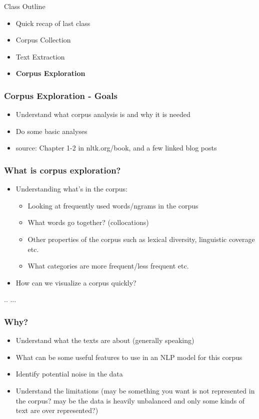 \documentclass{beamer}
\begin{document}
\begin{frame}{Class Outline}
\begin{itemize}
    \item Quick recap of last class
    \item Corpus Collection
    \item Text Extraction
    \item \textbf{Corpus Exploration}
\end{itemize}
\end{frame}

\begin{frame}
\frametitle{Corpus Exploration - Goals}
\begin{itemize}
\item Understand what corpus analysis is and why it is needed
\item Do some basic analyses
\item source: Chapter 1-2 in nltk.org/book, and a few linked blog posts
\end{itemize}
\end{frame}

\begin{frame}
\frametitle{What is corpus exploration?}
\begin{itemize}
\item Understanding what's in the corpus:
\begin{itemize}
\item Looking at frequently used words/ngrams in the corpus
\item What words go together? (collocations)
\item Other properties of the corpus such as lexical diversity, linguistic coverage etc.
\item What categories are more frequent/less frequent etc. 
\end{itemize}
\item How can we visualize a corpus quickly? 
\end{itemize}
.. ... 
\end{frame}

\begin{frame}
\frametitle{Why? }
\begin{itemize}
\item Understand what the texts are about (generally speaking)
\item What can be some useful features to use in an NLP model for this corpus
\item Identify potential noise in the data  
\item Understand the limitations (may be something you want is not represented in the corpus? may be the data is heavily unbalanced and only some kinds of text are over represented?)
\end{itemize}
\end{frame}
\end{document}
